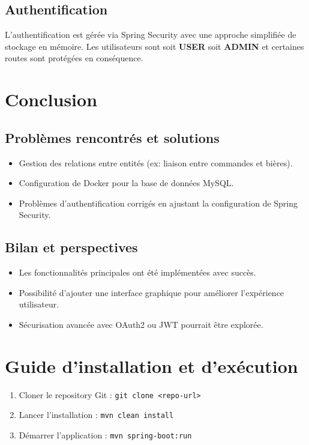 \documentclass{article}
\begin{document}
\subsection{Authentification}
L'authentification est gérée via Spring Security avec une approche simplifiée de stockage en mémoire.
Les utilisateurs sont soit \textbf{USER} soit \textbf{ADMIN} et certaines routes sont protégées en conséquence.

\section{Conclusion}

\subsection{Problèmes rencontrés et solutions}
\begin{itemize}
    \item Gestion des relations entre entités (ex: liaison entre commandes et bières).
    \item Configuration de Docker pour la base de données MySQL.
    \item Problèmes d'authentification corrigés en ajustant la configuration de Spring Security.
\end{itemize}

\subsection{Bilan et perspectives}
\begin{itemize}
    \item Les fonctionnalités principales ont été implémentées avec succès.
    \item Possibilité d'ajouter une interface graphique pour améliorer l'expérience utilisateur.
    \item Sécurisation avancée avec OAuth2 ou JWT pourrait être explorée.
\end{itemize}

\section{Guide d'installation et d'exécution}
\begin{enumerate}
    \item Cloner le repository Git : \texttt{git clone <repo-url>}
    \item Lancer l'installation : \texttt{mvn clean install}
    \item Démarrer l'application : \texttt{mvn spring-boot:run}
\end{enumerate}
\end{document}
